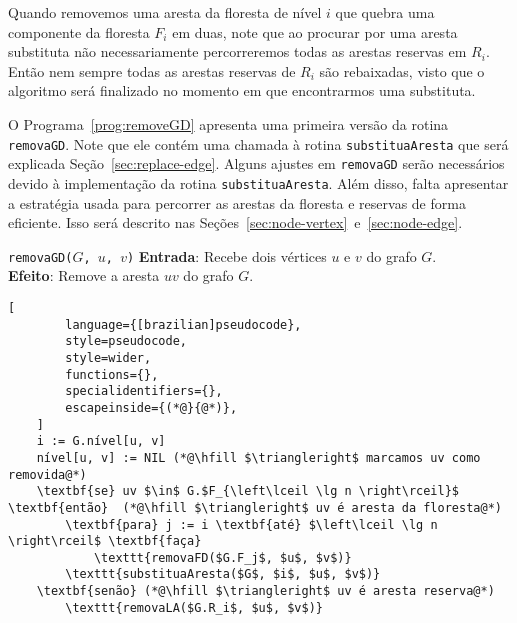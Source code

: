 Quando removemos uma aresta da floresta de nível $i$ que quebra uma componente da floresta $F_i$ em duas, note que ao procurar por uma aresta substituta não necessariamente percorreremos todas as arestas reservas em $R_i$. Então nem sempre todas as arestas reservas de $R_i$ são rebaixadas, visto que o algoritmo será finalizado no momento em que encontrarmos uma substituta.

O Programa~\ref{prog:removeGD} apresenta uma primeira versão da rotina \texttt{removaGD}. Note que ele contém uma chamada à rotina \texttt{substituaAresta} que será explicada Seção~\ref{sec:replace-edge}. Alguns ajustes em \texttt{removaGD} serão necessários devido à implementação da rotina \texttt{substituaAresta}. 
Além disso, falta apresentar a estratégia usada para percorrer as arestas da floresta e reservas de forma eficiente. Isso será descrito nas Seções~\ref{sec:node-vertex}~e~\ref{sec:node-edge}.

\begin{programruledcaption}{\texttt{removaGD($G$, $u$, $v$)} \label{prog:removeGD}}
    \noindent\textbf{Entrada}: Recebe dois vértices $u$ e $v$ do grafo $G$. \\
    \noindent\textbf{Efeito}: Remove a aresta $uv$ do grafo $G$. 
    \vspace{-0.5\baselineskip}
    \begin{lstlisting}[
        language={[brazilian]pseudocode},
        style=pseudocode,
        style=wider,
        functions={},
        specialidentifiers={},
        escapeinside={(*@}{@*)},
    ]
    i := G.nível[u, v]
    nível[u, v] := NIL (*@\hfill $\triangleright$ marcamos uv como removida@*)
    \textbf{se} uv $\in$ G.$F_{\left\lceil \lg n \right\rceil}$ \textbf{então}  (*@\hfill $\triangleright$ uv é aresta da floresta@*)
        \textbf{para} j := i \textbf{até} $\left\lceil \lg n \right\rceil$ \textbf{faça}
            \texttt{removaFD($G.F_j$, $u$, $v$)}
        \texttt{substituaAresta($G$, $i$, $u$, $v$)}
    \textbf{senão} (*@\hfill $\triangleright$ uv é aresta reserva@*)
        \texttt{removaLA($G.R_i$, $u$, $v$)}
    \end{lstlisting}
    \vspace{-0.5\baselineskip}
\end{programruledcaption}









































